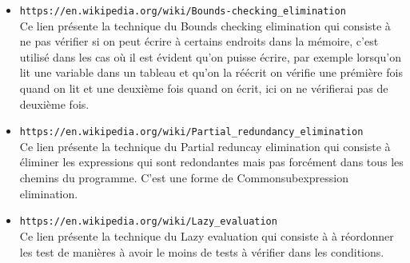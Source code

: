 \documentclass[a4paper]{article}
\begin{document}
\begin{itemize}
\item \texttt{https://en.wikipedia.org/wiki/Bounds-checking\_elimination} \\
Ce lien présente la technique du Bounds checking elimination qui consiste à ne pas vérifier si on peut écrire à certains endroits dans la mémoire, c'est utilisé dans les cas où il est évident qu'on puisse écrire, par exemple lorsqu'on lit une variable dans un tableau et qu'on la réécrit on vérifie une prémière fois quand on lit et une deuxième fois quand on écrit, ici on ne vérifierai pas de deuxième fois.\\

\item \texttt{https://en.wikipedia.org/wiki/Partial\_redundancy\_elimination} \\
Ce lien présente la technique du Partial reduncay elimination qui consiste à éliminer les expressions qui sont redondantes mais pas forcément dans tous les chemins du programme. C'est une forme de Commonsubexpression elimination.\\

\item \texttt{https://en.wikipedia.org/wiki/Lazy\_evaluation} \\
Ce lien présente la technique du Lazy evaluation qui consiste à à réordonner les test de manières à avoir le moins de tests à vérifier dans les conditions.\\

     \end{itemize}
\end{document}
